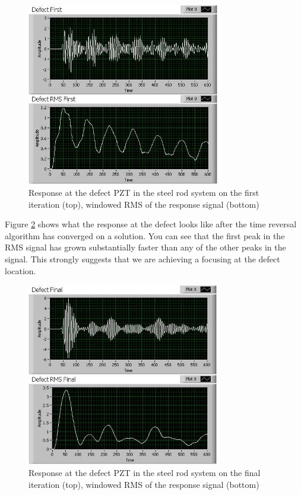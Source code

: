 \documentclass[]{aiaa-tc}%
\begin{document}
\begin{figure}[H]%
\centering
 \includegraphics[height = 8cm]{steel_initial}
 \caption{Response at the defect PZT in the steel rod system on the first iteration (top), windowed RMS of the response signal (bottom)}
 \label{fig:steel_initial}
\end{figure}

Figure \ref{fig:steel_final} shows what the response at the defect looks like after the time reversal algorithm has converged on a solution. You can see that the first peak in the RMS signal has grown substantially faster than any of the other peaks in the signal. This strongly suggests that we are achieving a focusing at the defect location.

\begin{figure}[H]%
\centering
 \includegraphics[height = 8cm]{steel_final}
 \caption{Response at the defect PZT in the steel rod system on the final iteration (top), windowed RMS of the response signal (bottom)}
 \label{fig:steel_final}
\end{figure}
\end{document}
